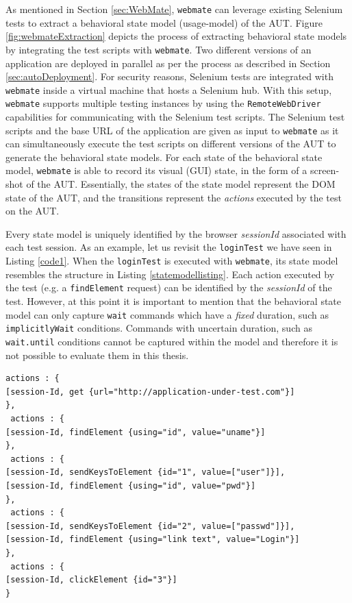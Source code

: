As mentioned in Section \ref{sec:WebMate}, \texttt{webmate} can leverage existing Selenium tests to extract a behavioral state model (usage-model) of the AUT. Figure \ref{fig:webmateExtraction} depicts the process of extracting behavioral state models by integrating the test scripts with \texttt{webmate}. Two different versions of an application are deployed in parallel as per the process as described in Section \ref{sec:autoDeployment}. For security reasons, Selenium tests are integrated with \texttt{webmate} inside a virtual machine that hosts a Selenium hub. With this setup, \texttt{webmate} supports multiple testing instances by using the \texttt{RemoteWebDriver} capabilities for communicating with the Selenium test scripts. The Selenium test scripts and the base URL of the application are given as input to \texttt{webmate} as it can simultaneously execute the test scripts on different versions of the AUT to generate the behavioral state models. For each state of the behavioral state model, \texttt{webmate} is able to record its visual (GUI) state, in the form of a screen-shot of the AUT. Essentially, the states of the state model represent the DOM state of the AUT, and the transitions represent the \textit{actions} executed by the test on the AUT.

Every state model is uniquely identified by the browser \textit{sessionId} associated with each test session. As an example, let us revisit the \texttt{loginTest} we have seen in Listing \ref{code1}. When the \texttt{loginTest} is executed with \texttt{webmate}, its state model resembles the structure in Listing \ref{statemodellisting}. Each action executed by the test (e.g. a \texttt{findElement} request) can be identified by the \textit{sessionId} of the test. However, at this point it is important to mention that the behavioral state model can only capture \texttt{wait} commands which have a \textit{fixed} duration, such as \texttt{implicitlyWait} conditions. Commands with uncertain duration, such as \texttt{wait.until} conditions cannot be captured within the model and therefore it is not possible to evaluate them in this thesis. 

\begin{center}
\begin{scriptsize}
\centering
\lstset{
  basicstyle=\ttfamily,
  columns=fullflexible,
  keepspaces=true,
}
  
\begin{lstlisting}[caption=Extracted behavioral state model for \texttt{loginTest},label=statemodellisting]
 actions : { 
[session-Id, get {url="http://application-under-test.com"}]
},
 actions : { 
[session-Id, findElement {using="id", value="uname"}]
},
 actions : { 
[session-Id, sendKeysToElement {id="1", value=["user"]}],
[session-Id, findElement {using="id", value="pwd"}]
},
 actions : { 
[session-Id, sendKeysToElement {id="2", value=["passwd"]}],
[session-Id, findElement {using="link text", value="Login"}]
},
 actions : { 
[session-Id, clickElement {id="3"}]
}
\end{lstlisting}
\end{scriptsize} 
\end{center}

